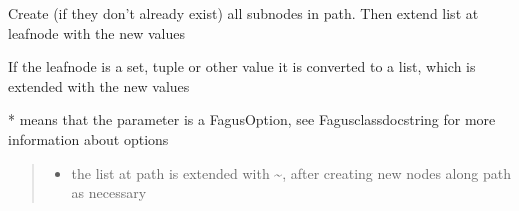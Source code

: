 \documentclass[a4paper,10pt,english]{sphinxmanual}
\begin{document}
\begin{fulllineitems}
\begin{fulllineitems}
\label{\detokenize{fagus:fagus.Fagus.extend}}
\pysigstartsignatures
{}
\pysigstopsignatures
\sphinxAtStartPar
Create (if they don’t already exist) all sub\sphinxhyphen{}nodes in path. Then extend list at leaf\sphinxhyphen{}node with the new values

\sphinxAtStartPar
If the leaf\sphinxhyphen{}node is a set, tuple or other value it is converted to a list, which is extended with the new values

\sphinxAtStartPar
* means that the parameter is a FagusOption, see Fagus\sphinxhyphen{}class\sphinxhyphen{}docstring for more information about options
\begin{quote}\begin{description}
\begin{itemize}
\item {}
\sphinxAtStartPar
{} \textendash{} the list at path is extended with \textasciitilde{}, after creating new nodes along path as necessary


\end{itemize}
\end{description}
\end{quote}
\end{fulllineitems}
\end{fulllineitems}
\end{document}
